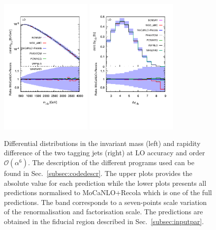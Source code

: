 \documentclass[twocolumn,epjc3]{svjour3} %
\newlength{\width}
\begin{document}
     \begin{figure}[htb!]
       \centering
       \includegraphics[width=0.4\textwidth,angle=0,clip=true,trim={0.4cm 2cm 0.cm 1.cm}]{figures/LO/mjj_LO.pdf}
       \includegraphics[width=0.4\textwidth,angle=0,clip=true,trim={0.4cm 2cm 0.cm 1.cm}]{figures/LO/dyj1j2_LO.pdf}
    \caption{\label{fig:wg1_mjj-llLO} Differential distributions in the invariant mass (left) and rapidity difference of the two tagging jets (right) at LO accuracy and order $\mathcal{O}(\alpha^6)$.
    The description of the different programs used can be found in Sec.~\protect\ref{subsec:codedescr}.
    The upper plots provides the absolute value for each prediction while the lower plots presents all predictions normalised to {\sc MoCaNLO}+{\sc Recola} which is one of the full predictions.
    The band corresponds to a seven-points scale variation of the renormalisation and factorisation scale.
    The predictions are obtained in the fiducial region described in Sec.~\protect\ref{subsec:inputpar}.}
    \end{figure}
\end{document}
